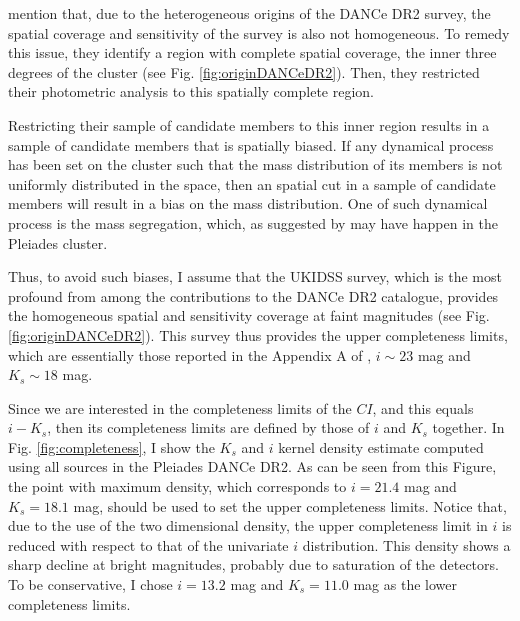 \citet{Bouy2015} mention that, due to the heterogeneous origins of the DANCe DR2 survey, the spatial coverage and sensitivity of the survey is also not homogeneous. To remedy this issue, they identify a region with complete spatial coverage, the inner three degrees of the cluster (see Fig. \ref{fig:originDANCeDR2}). Then, they restricted their photometric analysis to this spatially complete region. 

Restricting their sample of candidate members to this inner region results in a sample of candidate members that is spatially biased. If any dynamical process has been set on the cluster such that the mass distribution of its members is not uniformly distributed in the space, then an spatial cut in a sample of candidate members will result in a bias on the mass distribution. One of such dynamical process is the mass segregation, which, as suggested by \citet{Adams2001} may have happen in the Pleiades cluster. 

Thus, to avoid such biases, I assume that the UKIDSS survey, which is the most profound from among the contributions to the DANCe DR2 catalogue, provides the homogeneous spatial and sensitivity coverage at faint magnitudes (see Fig. \ref{fig:originDANCeDR2}). This survey thus provides the upper completeness limits, which are essentially those reported in the Appendix A of \citet{Bouy2015}, $i\sim23$ mag and $K_s\sim18$ mag.

Since we are interested in the completeness limits of the $CI$, and this equals $i -K_s$, then its completeness limits are defined by those of $i$ and $K_s$ together. In Fig. \ref{fig:completeness}, I show the $K_s$ and $i$ kernel density estimate computed using all sources in the Pleiades DANCe DR2. As can be seen from this Figure, the point with maximum density, which corresponds to $i=21.4$ mag and $K_s=18.1$ mag, should be used to set the upper completeness limits. Notice that, due to the use of the two dimensional density, the upper completeness limit in $i$ is reduced with respect to that of the univariate $i$ distribution. This density shows a sharp decline at bright magnitudes, probably due to saturation of the detectors. To be conservative, I chose $i=13.2$ mag and $K_s=11.0$ mag as the lower completeness limits.

